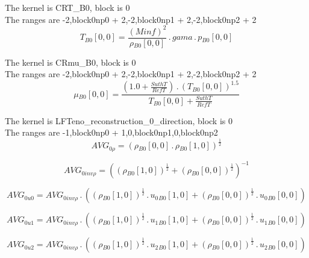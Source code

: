 \documentclass{article}
\begin{document}
\noindent The kernel is CRT_B0, block is 0\\\noindent The ranges are -2,block0np0 + 2,-2,block0np1 + 2,-2,block0np2 + 2\\\begin{dmath}{T{_{B0}}}[{0,0}] = \frac{\left(Minf \right)^{2}}{{\rho{_{B0}}}[{0,0}]} \,.\, gama \,.\, {p{_{B0}}}[{0,0}]\end{dmath}

\noindent The kernel is CRmu_B0, block is 0\\\noindent The ranges are -2,block0np0 + 2,-2,block0np1 + 2,-2,block0np2 + 2\\\begin{dmath}{\mu{_{B0}}}[{0,0}] = \frac{\left(1.0 + \frac{SuthT}{RefT}\right) \,.\, \left({T{_{B0}}}[{0,0}] \right)^{1.5}}{{T{_{B0}}}[{0,0}] + \frac{SuthT}{RefT}}\end{dmath}

\noindent The kernel is LFTeno_reconstruction_0_direction, block is 0\\\noindent The ranges are -1,block0np0 + 1,0,block0np1,0,block0np2\\\begin{dmath}AVG_{0 \rho} = \left({\rho{_{B0}}}[{0,0}] \,.\, {\rho{_{B0}}}[{1,0}] \right)^{\frac{1}{2}}\end{dmath}

\begin{dmath}AVG_{0 inv \rho} = \left(\left({\rho{_{B0}}}[{1,0}] \right)^{\frac{1}{2}} + \left({\rho{_{B0}}}[{0,0}] \right)^{\frac{1}{2}} \right)^{-1}\end{dmath}

\begin{dmath}AVG_{0 u0} = AVG_{0 inv \rho} \,.\, \left(\left({\rho{_{B0}}}[{1,0}] \right)^{\frac{1}{2}} \,.\, {u_{0}{_{B0}}}[{1,0}] + \left({\rho{_{B0}}}[{0,0}] \right)^{\frac{1}{2}} \,.\, {u_{0}{_{B0}}}[{0,0}]\right)\end{dmath}

\begin{dmath}AVG_{0 u1} = AVG_{0 inv \rho} \,.\, \left(\left({\rho{_{B0}}}[{1,0}] \right)^{\frac{1}{2}} \,.\, {u_{1}{_{B0}}}[{1,0}] + \left({\rho{_{B0}}}[{0,0}] \right)^{\frac{1}{2}} \,.\, {u_{1}{_{B0}}}[{0,0}]\right)\end{dmath}

\begin{dmath}AVG_{0 u2} = AVG_{0 inv \rho} \,.\, \left(\left({\rho{_{B0}}}[{1,0}] \right)^{\frac{1}{2}} \,.\, {u_{2}{_{B0}}}[{1,0}] + \left({\rho{_{B0}}}[{0,0}] \right)^{\frac{1}{2}} \,.\, {u_{2}{_{B0}}}[{0,0}]\right)\end{dmath}
\end{document}
